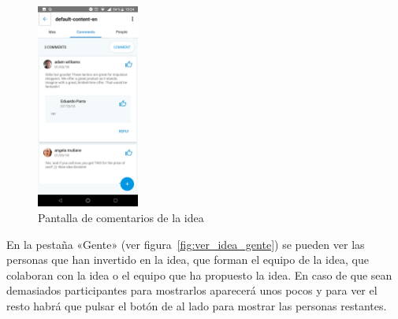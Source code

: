\begin{figure}[!h]
	\begin{center}
		\includegraphics[width=0.3\textwidth]{./img/anexo1/ver_idea_comentarios.png}
		\caption{Pantalla de comentarios de la idea}
		\label{fig:ver_idea_comentarios}
	\end{center}
\end{figure}

En la pestaña «Gente» (ver figura~\ref{fig:ver_idea_gente}) se pueden ver las personas 
que han invertido en la idea, que forman el equipo de la idea, que colaboran con la idea o 
el equipo que ha propuesto la idea. En caso de que sean demasiados participantes para 
mostrarlos aparecerá unos pocos y para ver el resto habrá que pulsar el botón de al lado 
para mostrar las personas restantes.


